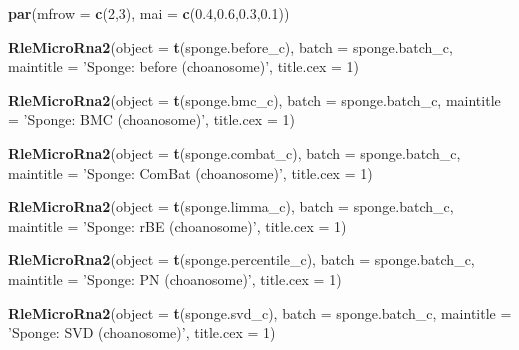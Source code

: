 \documentclass[]{book}
\newenvironment{Shaded}{\begin{snugshade}}{\end{snugshade}}
\newcommand{\KeywordTok}[1]{\textcolor[rgb]{0.13,0.29,0.53}{\textbf{#1}}}
\newcommand{\DataTypeTok}[1]{\textcolor[rgb]{0.13,0.29,0.53}{#1}}
\newcommand{\DecValTok}[1]{\textcolor[rgb]{0.00,0.00,0.81}{#1}}
\newcommand{\FloatTok}[1]{\textcolor[rgb]{0.00,0.00,0.81}{#1}}
\newcommand{\StringTok}[1]{\textcolor[rgb]{0.31,0.60,0.02}{#1}}
\newcommand{\NormalTok}[1]{#1}
\begin{document}
\begin{Shaded}
\begin{Highlighting}[]
\KeywordTok{par}\NormalTok{(}\DataTypeTok{mfrow =} \KeywordTok{c}\NormalTok{(}\DecValTok{2}\NormalTok{,}\DecValTok{3}\NormalTok{), }\DataTypeTok{mai =} \KeywordTok{c}\NormalTok{(}\FloatTok{0.4}\NormalTok{,}\FloatTok{0.6}\NormalTok{,}\FloatTok{0.3}\NormalTok{,}\FloatTok{0.1}\NormalTok{))}

\KeywordTok{RleMicroRna2}\NormalTok{(}\DataTypeTok{object =} \KeywordTok{t}\NormalTok{(sponge.before_c), }\DataTypeTok{batch =}\NormalTok{ sponge.batch_c, }
             \DataTypeTok{maintitle =} \StringTok{'Sponge: before (choanosome)'}\NormalTok{, }\DataTypeTok{title.cex =} \DecValTok{1}\NormalTok{)}

\KeywordTok{RleMicroRna2}\NormalTok{(}\DataTypeTok{object =} \KeywordTok{t}\NormalTok{(sponge.bmc_c), }\DataTypeTok{batch =}\NormalTok{ sponge.batch_c, }
             \DataTypeTok{maintitle =} \StringTok{'Sponge: BMC (choanosome)'}\NormalTok{, }\DataTypeTok{title.cex =} \DecValTok{1}\NormalTok{)}

\KeywordTok{RleMicroRna2}\NormalTok{(}\DataTypeTok{object =} \KeywordTok{t}\NormalTok{(sponge.combat_c), }\DataTypeTok{batch =}\NormalTok{ sponge.batch_c, }
             \DataTypeTok{maintitle =} \StringTok{'Sponge: ComBat (choanosome)'}\NormalTok{, }\DataTypeTok{title.cex =} \DecValTok{1}\NormalTok{)}

\KeywordTok{RleMicroRna2}\NormalTok{(}\DataTypeTok{object =} \KeywordTok{t}\NormalTok{(sponge.limma_c), }\DataTypeTok{batch =}\NormalTok{ sponge.batch_c, }
             \DataTypeTok{maintitle =} \StringTok{'Sponge: rBE (choanosome)'}\NormalTok{, }\DataTypeTok{title.cex =} \DecValTok{1}\NormalTok{)}

\KeywordTok{RleMicroRna2}\NormalTok{(}\DataTypeTok{object =} \KeywordTok{t}\NormalTok{(sponge.percentile_c), }\DataTypeTok{batch =}\NormalTok{ sponge.batch_c, }
             \DataTypeTok{maintitle =} \StringTok{'Sponge: PN (choanosome)'}\NormalTok{, }\DataTypeTok{title.cex =} \DecValTok{1}\NormalTok{)}

\KeywordTok{RleMicroRna2}\NormalTok{(}\DataTypeTok{object =} \KeywordTok{t}\NormalTok{(sponge.svd_c), }\DataTypeTok{batch =}\NormalTok{ sponge.batch_c, }
             \DataTypeTok{maintitle =} \StringTok{'Sponge: SVD (choanosome)'}\NormalTok{, }\DataTypeTok{title.cex =} \DecValTok{1}\NormalTok{)}
\end{Highlighting}
\end{Shaded}
\end{document}
